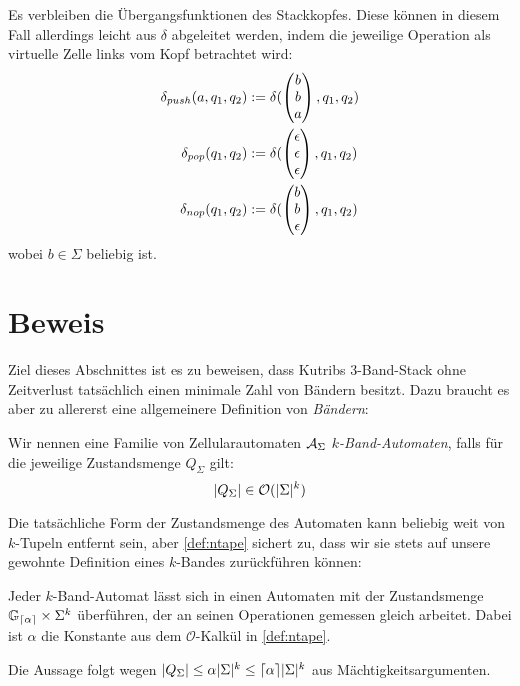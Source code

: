 \documentclass{article}
\begin{document}
Es verbleiben die Übergangsfunktionen des Stackkopfes. Diese können in diesem Fall allerdings leicht aus $\delta$ abgeleitet werden, indem die jeweilige Operation als virtuelle Zelle links vom Kopf betrachtet wird:
\begin{align*}
    \delta_{push}(a, q_1, q_2) &:= \delta(\begin{pmatrix}b\\b\\a\end{pmatrix}, q_1, q_2) \\
    \delta_{pop}(q_1, q_2) &:= \delta(\begin{pmatrix}\epsilon\\\epsilon\\\epsilon\end{pmatrix}, q_1, q_2) \\
    \delta_{nop}(q_1, q_2) &:= \delta(\begin{pmatrix}b\\b\\\epsilon\end{pmatrix}, q_1, q_2) \\
\end{align*}
wobei $b \in \Sigma$ beliebig ist.


\section{Beweis}

Ziel dieses Abschnittes ist es zu beweisen, dass Kutribs 3-Band-Stack ohne Zeitverlust tatsächlich einen minimale Zahl von Bändern besitzt. Dazu braucht es aber zu allererst eine allgemeinere Definition von \emph{Bändern}:
\begin{definition}
    Wir nennen eine Familie von Zellularautomaten $\mathcal{A}_\Sigma$ \emph{$k$-Band-Automaten}, falls für die jeweilige Zustandsmenge $Q_\Sigma$ gilt:
    \begin{equation}
        \lvert Q_\Sigma\rvert \in \mathcal{O}(\lvert\Sigma\rvert^k) \label{def:ntape}
    \end{equation}
\end{definition}

Die tatsächliche Form der Zustandsmenge des Automaten kann beliebig weit von $k$-Tupeln entfernt sein, aber \eqref{def:ntape} sichert zu, dass wir sie stets auf unsere gewohnte Definition eines $k$-Bandes zurückführen können:

\begin{satz}
    \label{thm:tape-hom}
    Jeder $k$-Band-Automat lässt sich in einen Automaten mit der Zustandsmenge $\mathbb{G}_{\lceil\alpha\rceil} \times \Sigma^k$ überführen, der an seinen Operationen gemessen gleich arbeitet. Dabei ist $\alpha$ die Konstante aus dem $\mathcal{O}$-Kalkül in \eqref{def:ntape}.

    \begin{beweis}
        Die Aussage folgt wegen $\lvert Q_\Sigma\rvert \leq \alpha \lvert\Sigma\rvert^k \leq \lceil\alpha\rceil \lvert\Sigma\rvert^k$ aus Mächtigkeitsargumenten.
    \end{beweis}
\end{satz}
\end{document}
